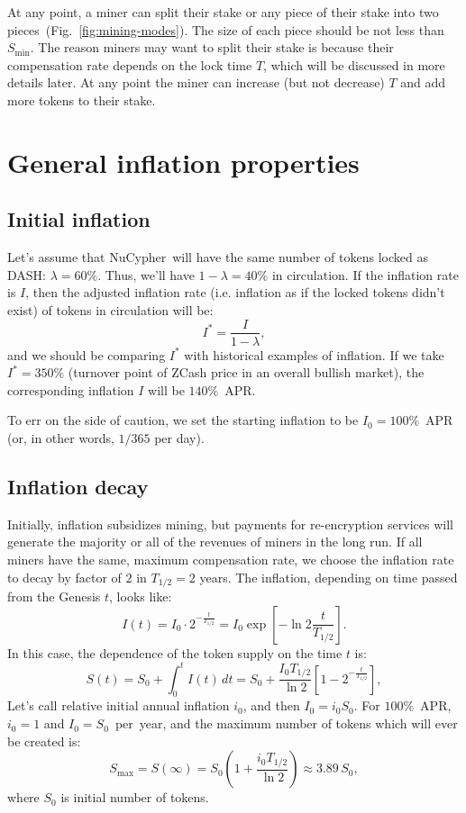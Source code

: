 \documentclass[longbibliography,nofootinbib,twocolumn]{revtex4-1}
\newcommand{\kms}{NuCypher}
\newcommand{\figref}[1]{Fig.~\ref{#1}}
\begin{document}
At any point, a miner can split their stake or any piece of their stake into two pieces~(\figref{fig:mining-modes}).
The size of each piece should be not less than $S_{\min}$.
The reason miners may want to split their stake is because their compensation rate depends on the lock time $T$,
which will be discussed in more details later.
At any point the miner can increase (but not decrease) $T$ and add more tokens to their stake.

\section{General inflation properties}

\subsection{Initial inflation}

Let's assume that \kms~will have the same number of tokens locked as DASH: $\lambda=60\%$.
Thus, we'll have $1-\lambda=40\%$ in circulation.
If the inflation rate is $I$, then the adjusted inflation rate (i.e. inflation as if the locked tokens didn't exist) of tokens in circulation will be:
\begin{equation}
    I^* = \frac{I}{1-\lambda},
\end{equation}
and we should be comparing $I^*$ with historical examples of inflation.
If we take $I^*=350\%$ (turnover point of ZCash price in an overall bullish market), the corresponding inflation $I$ will be $140\%$~APR.

To err on the side of caution, we set the starting inflation to be $I_0=100\%$~APR (or, in other words, $1/365$ per day).

\subsection{Inflation decay}

Initially, inflation subsidizes mining, but payments for re-encryption services will generate the majority or all of the revenues of miners in the long run.
If all miners have the same, maximum compensation rate, we choose the inflation rate to decay by factor of $2$ in $T_{1/2} = 2$ years.
The inflation, depending on time passed from the Genesis $t$, looks like:
\begin{equation}
    I(t) = I_0 \cdot 2^{-\frac{t}{T_{1/2}}} = I_0 \exp\left[ -\ln{2} \frac{t}{T_{1/2}} \right].
\end{equation}
In this case, the dependence of the token supply on the time $t$ is:
\begin{equation}
    \label{eq:supply-time}
    S(t) = S_0 + \int_0^{t} I(t)\, dt = S_0 + \frac{I_0 T_{1/2}}{\ln{2}}\left[1 - 2^{-\frac{t}{T_{1/2}}} \right],
\end{equation}
Let's call relative initial annual inflation $i_0$, and then $I_0 = i_0 S_0$.
For $100\%$~APR, $i_0=1$ and $I_0=S_0$~per~year, and the maximum number of tokens which will ever be created is:
\begin{equation}
    S_{\max} = S(\infty) = S_0\left(1 + \frac{i_0 T_{1/2}}{\ln{2}}\right) \approx 3.89\, S_0,
\end{equation}
where $S_0$ is initial number of tokens.
\end{document}
